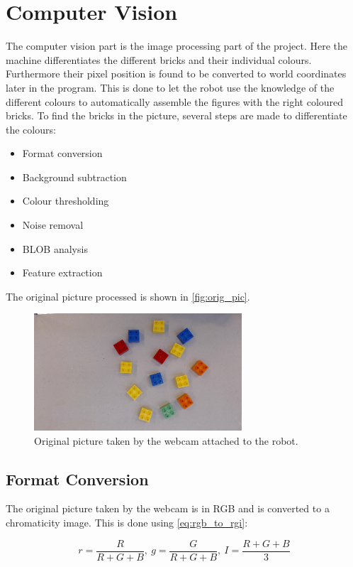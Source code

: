 \chapter{Computer Vision}
The computer vision part is the image processing part of the project. Here the machine differentiates the different \lego bricks and their individual colours. Furthermore their pixel position is found to be converted to world coordinates later in the program.
This is done to let the robot use the knowledge of the different colours to automatically assemble the figures with the right coloured bricks.
To find the bricks in the picture, several steps are made to differentiate the colours:

\begin{itemize}
	\item Format conversion
	\item Background subtraction
	\item Colour thresholding
	\item Noise removal
	\item BLOB analysis
	\item Feature extraction
\end{itemize}

The original picture processed is shown in \autoref{fig:orig_pic}.

\begin{figure}
	\centering
	\includegraphics[width=0.69\textwidth]{figures/orig_pic.jpg}
	\caption{Original picture taken by the webcam attached to the robot.}
	\label{fig:orig_pic}
\end{figure}

\section{Format Conversion}
The original picture taken by the webcam is in RGB and is converted to a chromaticity image. This is done using \autoref{eq:rgb_to_rgi}:

\begin{equation}\label{eq:rgb_to_rgi}
	r=\frac{R}{R+G+B}, ~g=\frac{G}{R+G+B}, ~I=\frac{R+G+B}{3}
\end{equation}

